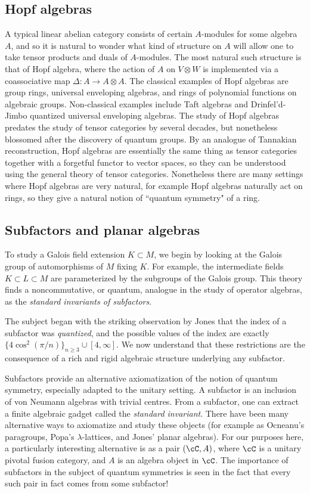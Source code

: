\documentclass[12pt]{article}
\begin{document}
\subsection{Hopf algebras}
A typical linear abelian category consists of certain $A$-modules for some algebra $A$, and so it is natural to wonder what kind of structure on $A$ will allow one to take tensor products and duals of $A$-modules. The most natural such structure is that of Hopf algebra, where the action of $A$ on $V \otimes W$ is implemented via a coassociative map $\Delta: A \rightarrow A \otimes A$. The classical examples of Hopf algebras are group rings, universal enveloping algebras, and rings of polynomial functions on algebraic groups.  Non-classical examples include Taft algebras and Drinfel'd-Jimbo quantized universal enveloping algebras.  The study of Hopf algebras predates the study of tensor categories by several decades, but nonetheless blossomed after the discovery of quantum groups. By an analogue of Tannakian reconstruction, Hopf algebras are essentially the same thing as tensor categories together with a forgetful functor to vector spaces, so they can be understood using the general theory of tensor categories. Nonetheless there are many settings where Hopf algebras are very natural, for example Hopf algebras naturally act on rings, so they give a natural notion of ``quantum symmetry" of a ring.


\subsection{Subfactors and planar algebras}
To study a Galois field extension $K \subset M$, we begin by looking at the
Galois group of automorphisms of $M$ fixing $K$. For example, the intermediate
fields $K \subset L \subset M$ are parameterized by the subgroups of the
Galois group. This theory finds a noncommutative, or quantum, analogue in the
study of operator algebras, as the \emph{standard invariants of subfactors}.

The subject began with the striking observation by Jones that the index of a
subfactor was \emph{quantized}, and the possible values of the index are
exactly $\{4 \cos^2(\pi/n)\}_{n \geq 3} \cup [4,\infty]$. We now understand
that these restrictions are the consequence of a rich and rigid algebraic
structure underlying any subfactor.

Subfactors provide an alternative axiomatization of the notion of quantum
symmetry, especially adapted to the unitary setting. A subfactor is an
inclusion of von Neumann algebras with trivial centres. From a subfactor, one
can extract a finite algebraic gadget called the \emph{standard invariant}.
There have been many alternative ways to axiomatize and study these objects
(for example as Ocneanu's paragroups, Popa's $\lambda$-lattices, and Jones'
planar algebras). For our purposes here, a particularly interesting
alternative is as a pair $(\cC, A)$, where $\cC$ is a unitary pivotal fusion
category, and $A$ is an algebra object in $\cC$. The importance of subfactors
in the subject of quantum symmetries is seen in the fact that every such pair
in fact comes from some subfactor!
\end{document}
